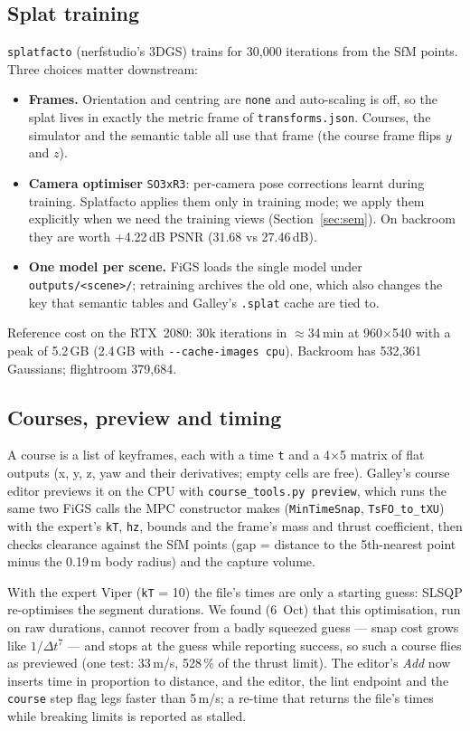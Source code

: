 \documentclass[11pt,a4paper]{article}
\newcommand{\code}[1]{\texttt{#1}}
\begin{document}
\subsection{Splat training}
\code{splatfacto} (nerfstudio's 3DGS) trains for 30{,}000 iterations from the SfM points. Three
choices matter downstream:
\begin{itemize}
  \item \textbf{Frames.} Orientation and centring are \code{none} and auto-scaling is off, so the splat
        lives in exactly the metric frame of \code{transforms.json}. Courses, the simulator and the
        semantic table all use that frame (the course frame flips $y$ and $z$).
  \item \textbf{Camera optimiser} \code{SO3xR3}: per-camera pose corrections learnt during training.
        Splatfacto applies them only in training mode; we apply them explicitly when we need the
        training views (Section~\ref{sec:sem}). On backroom they are worth +4.22\,dB PSNR
        (31.68 vs 27.46\,dB).
  \item \textbf{One model per scene.} FiGS loads the single model under \code{outputs/<scene>/};
        retraining archives the old one, which also changes the key that semantic tables and
        Galley's \code{.splat} cache are tied to.
\end{itemize}
Reference cost on the RTX~2080: 30k iterations in $\approx$34\,min at 960$\times$540 with a peak of
5.2\,GB (2.4\,GB with \code{-{}-cache-images cpu}). Backroom has 532{,}361 Gaussians; flightroom
379{,}684.

\subsection{Courses, preview and timing}
A course is a list of keyframes, each with a time \code{t} and a 4$\times$5 matrix of flat outputs
(x, y, z, yaw and their derivatives; empty cells are free). Galley's course editor previews it on
the CPU with \code{course\_tools.py preview}, which runs the same two FiGS calls the MPC constructor
makes (\code{MinTimeSnap}, \code{TsFO\_to\_tXU}) with the expert's \code{kT}, \code{hz}, bounds and the
frame's mass and thrust coefficient, then checks clearance against the SfM points (gap = distance to
the 5th-nearest point minus the 0.19\,m body radius) and the capture volume.

With the expert Viper (\code{kT} = 10) the file's times are only a starting guess: SLSQP re-optimises
the segment durations. We found (6~Oct) that this optimisation, run on raw durations, cannot recover
from a badly squeezed guess --- snap cost grows like $1/\Delta t^{7}$ --- and stops at the guess
while reporting success, so such a course flies as previewed (one test: 33\,m/s, 528\,\% of the
thrust limit). The editor's \emph{Add} now inserts time in proportion to distance, and the
editor, the lint endpoint and the \code{course} step flag legs faster than 5\,m/s; a re-time that
returns the file's times while breaking limits is reported as stalled.
\end{document}

